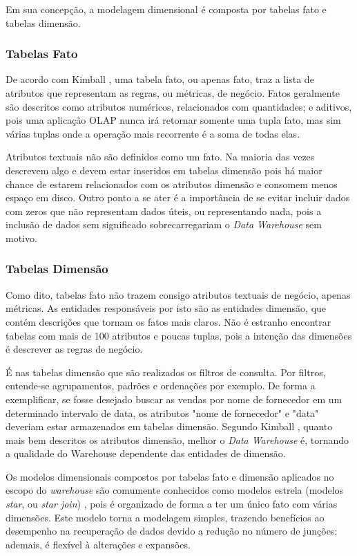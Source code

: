 \documentclass[conference]{IEEEtran}
\begin{document}
Em sua concepção, a modelagem dimensional é composta por tabelas fato e tabelas dimensão.

\subsubsection{Tabelas Fato}

De acordo com Kimball \cite{kimball2002dw}, uma tabela fato, ou apenas fato, traz a lista de atributos que representam as regras, ou métricas, de negócio. Fatos geralmente são descritos como atributos numéricos, relacionados com quantidades; e aditivos, pois uma aplicação OLAP nunca irá retornar somente uma tupla fato, mas sim várias tuplas onde a operação mais recorrente é a soma de todas elas.

Atributos textuais não são definidos como um fato. Na maioria das vezes descrevem algo e devem estar inseridos em tabelas dimensão pois há maior chance de estarem relacionados com os atributos dimensão e consomem menos espaço em disco. Outro ponto a se ater é a importância de se evitar incluir dados com zeros que não representam dados úteis, ou representando nada, pois a inclusão de dados sem significado sobrecarregariam o \textit{Data Warehouse} sem motivo.

\subsubsection{Tabelas Dimensão}
Como dito, tabelas fato não trazem consigo atributos textuais de negócio, apenas métricas. As entidades responsáveis por isto são as entidades dimensão, que contém descrições que tornam os fatos mais claros. Não é estranho encontrar tabelas com mais de 100 atributos e poucas tuplas, pois a intenção das dimensões é descrever as regras de negócio.

É nas tabelas dimensão que são realizados os filtros de consulta. Por filtros, entende-se agrupamentos, padrões e ordenações por exemplo. De forma a exemplificar, se fosse desejado buscar as vendas por nome de fornecedor em um determinado intervalo de data, os atributos "nome de fornecedor" e "data" deveriam estar armazenados em tabelas dimensão. Segundo Kimball \cite{kimball2002dw}, quanto mais bem descritos os atributos dimensão, melhor o \textit{Data Warehouse} é, tornando a qualidade do Warehouse dependente das entidades de dimensão.

Os modelos dimensionais compostos por tabelas fato e dimensão aplicados no escopo do \textit{warehouse} são comumente conhecidos como modelos estrela (modelos \textit{star}, ou \textit{star join}) \cite{wrembel2007data, kimball2002dw, inmon2005building,sen2005comparison}, pois é organizado de forma a ter um único fato com várias dimensões. Este modelo torna a modelagem simples, trazendo benefícios ao desempenho na recuperação de dados devido a redução no número de junções; ademais, é flexível à alterações e expansões.
\end{document}
